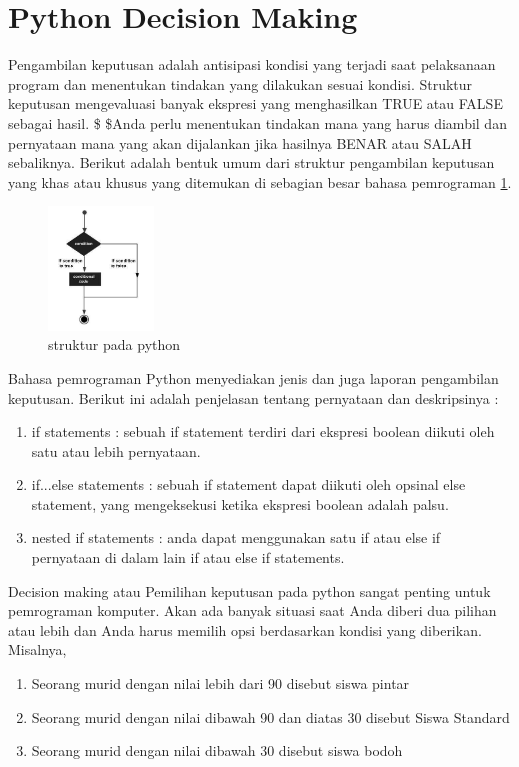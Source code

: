\section{Python Decision Making}
Pengambilan keputusan adalah antisipasi kondisi yang terjadi saat pelaksanaan program dan menentukan tindakan yang dilakukan sesuai kondisi. 
Struktur keputusan mengevaluasi banyak ekspresi yang menghasilkan TRUE atau FALSE sebagai hasil. \$  \$Anda perlu menentukan tindakan mana yang harus diambil dan pernyataan mana yang akan dijalankan jika hasilnya BENAR atau SALAH sebaliknya. 
Berikut adalah bentuk umum dari struktur pengambilan keputusan yang khas atau khusus yang ditemukan di sebagian besar bahasa pemrograman
\ref{struktur}.
\begin{figure}[ht]
    \centerline{\includegraphics[width=0.25\textwidth]{figures/struktur.png}}
    \caption{struktur pada python}
    \label{struktur}
    \end{figure}\par
Bahasa pemrograman Python menyediakan jenis dan juga laporan pengambilan keputusan. Berikut ini adalah penjelasan tentang pernyataan dan deskripsinya :
\begin{enumerate}
\item
if statements : sebuah if statement terdiri dari ekspresi boolean diikuti oleh satu atau lebih pernyataan. \par
\item
if...else statements : sebuah if statement dapat diikuti oleh opsinal else statement, yang mengeksekusi ketika ekspresi boolean adalah palsu. \par
\item
nested if statements : anda dapat menggunakan satu if atau else if pernyataan di dalam lain if atau else if statements. \par
\end{enumerate}
Decision making atau Pemilihan keputusan pada python sangat penting untuk pemrograman komputer. Akan ada banyak situasi saat Anda diberi dua pilihan atau lebih dan Anda harus memilih opsi berdasarkan kondisi yang diberikan. Misalnya,
\begin{enumerate} \par
\item
Seorang murid dengan nilai lebih dari 90 disebut siswa pintar \par
\item
Seorang murid dengan nilai dibawah 90 dan diatas 30 disebut Siswa Standard \par
\item
Seorang murid dengan nilai dibawah 30 disebut siswa bodoh \par
\end{enumerate}\par

